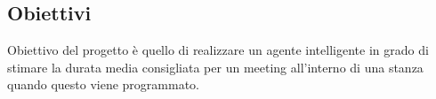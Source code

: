 \subsection{Obiettivi}
\fancyhead{}    %
\label{paragrafo 1.1}
\par{
Obiettivo del progetto è quello di realizzare un agente intelligente in grado di stimare la durata media consigliata per un meeting all'interno di una stanza quando questo viene programmato.
}